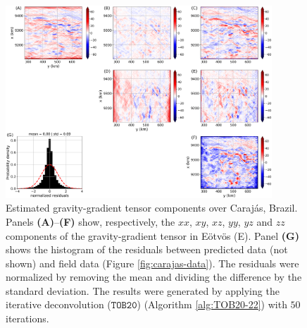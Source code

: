 \begin{figure}[htbp]
	\begin{center}
		\includegraphics[width=10cm]{Fig/carajas_grav_gradient}
	\end{center}
	\caption{
		Estimated gravity-gradient tensor components over Caraj{\'a}s, Brazil.
		Panels \textbf{(A)}--\textbf{(F)} show, respectively, the $xx$, $xy$, $xz$, $yy$, $yz$ and
		$zz$ components of the gravity-gradient tensor in Eötvös (E).
		Panel \textbf{(G)} shows the histogram of the residuals between predicted data (not shown) and field data 
		(Figure \ref{fig:carajas-data}). 
		The residuals were normalized by removing the mean and dividing the difference
		by the standard deviation.
		The results were generated by applying the iterative deconvolution ($\mathtt{TOB20}$)
		(Algorithm \ref{alg:TOB20-22})
		with $50$ iterations.
		}
	\label{fig:carajas-grav-gradient}
\end{figure}



%

%
